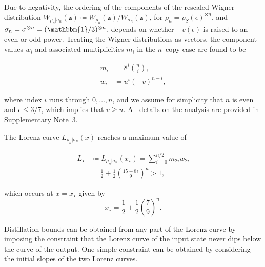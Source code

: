 \documentclass[
onecolumn,
superscriptaddress
]{revtex4-1}
\def\id{\mathbbm{1}}
\def\z{\boldsymbol{z}}
\begin{document}
Due to negativity, the ordering of the components of the rescaled Wigner distribution $W_{\rho_n |\sigma_n}(\z) \coloneqq W_{\rho_n}(\z)/W_{\sigma_n}(\z)$, for $\rho_n = \rho_S(\epsilon)^{\otimes n}$, and $\sigma_n = \sigma^{\otimes n}= (\id/3)^{\otimes n}$, depends on whether $-v(\epsilon)$ is raised to an even or odd power. Treating the Wigner distributions as vectors, the component values $w_i$ and associated multiplicities $m_i$ in the $n$--copy case are found to be 
\begin{linenomath}\begin{align}
	m_i &= 8^{i}\binom{n}{i}, \\
	w_i &= u^{i}(-v)^{n-i}, \label{eq:wigu}
\end{align}\end{linenomath}
where index $i$ runs through $0, \dots, n$, and we assume for simplicity that $n$ is even and $\epsilon \leq 3/7$, which implies that $v \geq u$.
All details on the analysis are provided in Supplementary Note~3.

The Lorenz curve $L_{\rho_n|\sigma_n}(x)$ reaches a maximum value of
\begin{linenomath}\begin{align}\label{eq:lcsu_max}
	L_\star &\coloneqq L_{\rho_n |\sigma_n} (x_\star) = \sum_{i = 0}^{n/2} m_{2i} w_{2i} \nonumber\\
	&= \frac{1}{2} + \frac{1}{2}\left(\frac{15 - 8\epsilon}{9}\right)^n > 1,
\end{align}\end{linenomath}
which occurs at $x=x_\star$ given by
\begin{equation}
	x_\star = \frac{1}{2} + \frac{1}{2}\left(\frac{7}{9}\right)^n.
\end{equation}

Distillation bounds can be obtained from any part of the Lorenz curve by imposing the constraint that the Lorenz curve of the input state never dips below the curve of the output. One simple constraint can be obtained by considering the initial slopes of the two Lorenz curves. 
\end{document}
